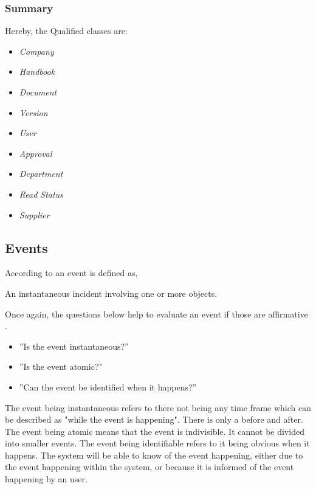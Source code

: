 \subsubsection*{Summary}
Hereby, the Qualified classes are:
\begin{multicols}{4}
	\begin{itemize}
	\item \textit{Company}
	\item \textit{Handbook}
	\item \textit{Document}
	\item \textit{Version}
	\item \textit{User}
	\item \textit{Approval}
	\item \textit{Department}
	\item \textit{Read Status}
	\item \textit{Supplier}
	\end{itemize}
\end{multicols}

\subsection{Events} \label{sec:Events}
According to \citep[p.~53]{Rod-Aalborg} an event is defined as,
\begin{defn}\label{defn:Event}
An instantaneous incident involving one or more objects.
\end{defn}

Once again, the questions below help to evaluate an event if those are affirmative \citep[p.~65]{Rod-Aalborg}.
\begin{itemize}
	\item ''Is the event instantaneous?''
	\item ''Is the event atomic?''
	\item ''Can the event be identified when it happens?''
\end{itemize}

The event being instantaneous refers to there not being any time frame which can be described as "while the event is happening". 
There is only a before and after.
The event being atomic means that the event is indivisible. 
It cannot be divided into smaller events.
The event being identifiable refers to it being obvious when it happens. The system will be able to know of the event happening, either due to the event happening within the system, or because it is informed of the event happening by an user.


